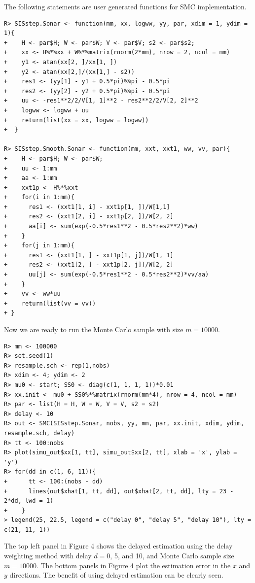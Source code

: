 The following statements are user generated functions for SMC implementation.
\begin{verbatim}
R> SISstep.Sonar <- function(mm, xx, logww, yy, par, xdim = 1, ydim = 1){
+    H <- par$H; W <- par$W; V <- par$V; s2 <- par$s2;
+    xx <- H%*%xx + W%*%matrix(rnorm(2*mm), nrow = 2, ncol = mm)
+    y1 <- atan(xx[2, ]/xx[1, ])
+    y2 <- atan(xx[2,]/(xx[1,] - s2))   
+    res1 <- (yy[1] - y1 + 0.5*pi)%%pi - 0.5*pi
+    res2 <- (yy[2] - y2 + 0.5*pi)%%pi - 0.5*pi
+    uu <- -res1**2/2/V[1, 1]**2 - res2**2/2/V[2, 2]**2
+    logww <- logww + uu
+    return(list(xx = xx, logww = logww))
+  }

R> SISstep.Smooth.Sonar <- function(mm, xxt, xxt1, ww, vv, par){
+    H <- par$H; W <- par$W;
+    uu <- 1:mm
+    aa <- 1:mm
+    xxt1p <- H%*%xxt
+    for(i in 1:mm){
+      res1 <- (xxt1[1, i] - xxt1p[1, ])/W[1,1]
+      res2 <- (xxt1[2, i] - xxt1p[2, ])/W[2, 2]
+      aa[i] <- sum(exp(-0.5*res1**2 - 0.5*res2**2)*ww)
+    }
+    for(j in 1:mm){
+      res1 <- (xxt1[1, ] - xxt1p[1, j])/W[1, 1]
+      res2 <- (xxt1[2, ] - xxt1p[2, j])/W[2, 2]
+      uu[j] <- sum(exp(-0.5*res1**2 - 0.5*res2**2)*vv/aa)
+    }
+    vv <- ww*uu
+    return(list(vv = vv))
+ }
\end{verbatim}

Now we are ready to run the Monte Carlo sample with size $m=10000$. 
\begin{verbatim}
R> mm <- 100000
R> set.seed(1)
R> resample.sch <- rep(1,nobs)
R> xdim <- 4; ydim <- 2
R> mu0 <- start; SS0 <- diag(c(1, 1, 1, 1))*0.01
R> xx.init <- mu0 + SS0%*%matrix(rnorm(mm*4), nrow = 4, ncol = mm)
R> par <- list(H = H, W = W, V = V, s2 = s2)
R> delay <- 10
R> out <- SMC(SISstep.Sonar, nobs, yy, mm, par, xx.init, xdim, ydim, resample.sch, delay)
R> tt <- 100:nobs
R> plot(simu_out$xx[1, tt], simu_out$xx[2, tt], xlab = 'x', ylab = 'y')
R> for(dd in c(1, 6, 11)){
+      tt <- 100:(nobs - dd)
+      lines(out$xhat[1, tt, dd], out$xhat[2, tt, dd], lty = 23 - 2*dd, lwd = 1)
+    }
> legend(25, 22.5, legend = c("delay 0", "delay 5", "delay 10"), lty = c(21, 11, 1))
\end{verbatim}


The top left panel in Figure 4 shows the delayed estimation using the delay weighting method with delay $d=0$, 5, and 10, and Monte Carlo sample size $m=10000$. The bottom panels in Figure 4 plot the estimation error in the $x$ and $y$ directions. The benefit of using delayed estimation can be clearly seen. 

